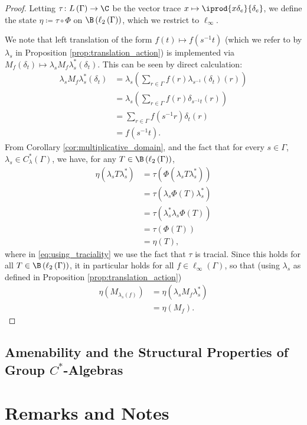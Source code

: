 \begin{proof}
  Letting $\tau\colon L\left( \Gamma \right)\rightarrow \C$ be the vector trace $x\mapsto \iprod{x\delta_e}{\delta_e}$, we define the state $\eta\coloneq \tau\circ \Phi$ on $\B\left( \ell_2\left( \Gamma \right) \right)$, which we restrict to $\ell_{\infty}$.\newline

  We note that left translation of the form $f(t) \mapsto f\left( s^{-1}t \right)$ (which we refer to by $\lambda_s$ in Proposition \ref{prop:translation_action}) is implemented via $M_{f}(\delta_t) \mapsto \lambda_{s}M_f\lambda_{s}^{\ast}\left( \delta_t \right)$. This can be seen by direct calculation:
  \begin{align*}
    \lambda_sM_f\lambda_s^{\ast}\left( \delta_t \right) &= \lambda_s\left( \sum_{r\in\Gamma}f(r)\lambda_{s^{-1}}\left( \delta_t \right) \left( r \right) \right)\\
                                                        &= \lambda_s\left( \sum_{r\in\Gamma}f(r)\delta_{s^{-1}t}(r) \right)\\
                                                        &= \sum_{r\in\Gamma}f\left( s^{-1}r \right)\delta_t(r)\\
                                                        &= f\left( s^{-1}t \right).
  \end{align*}
  From Corollary \ref{cor:multiplicative_domain}, and the fact that for every $s\in\Gamma$, $\lambda_s\in C^{\ast}_{\lambda}\left( \Gamma \right)$, we have, for any $T\in \B\left( \ell_2\left( \Gamma \right) \right)$,
  \begin{align*}
    \eta\left( \lambda_s T \lambda_s^{\ast} \right) &= \tau\left( \Phi\left( \lambda_s T \lambda_s^{\ast} \right) \right)\\
                                                    &= \tau\left( \lambda_s \Phi(T) \lambda_s^{\ast}\right)\\
                                                    &= \tau\left( \lambda_s^{\ast}\lambda_s\Phi(T) \right)\label{eq:using_traciality}\tag{\textasteriskcentered}\\
                                                    &= \tau\left( \Phi\left( T \right) \right)\\
                                                    &= \eta(T),
  \end{align*}
  where in \eqref{eq:using_traciality} we use the fact that $\tau$ is tracial. Since this holds for all $T\in\B\left( \ell_2\left( \Gamma \right) \right)$, it in particular holds for all $f\in\ell_{\infty}\left( \Gamma \right)$, so that (using $\lambda_s$ as defined in Proposition \ref{prop:translation_action}) 
  \begin{align*}
    \eta\left( M_{\lambda_s(f)} \right) &= \eta\left( \lambda_sM_f\lambda_s^{\ast} \right)\\
                                    &= \eta\left( M_f \right).
  \end{align*}
\end{proof}

\subsection{Amenability and the Structural Properties of Group $C^{\ast}$-Algebras}%

\section{Remarks and Notes}%
